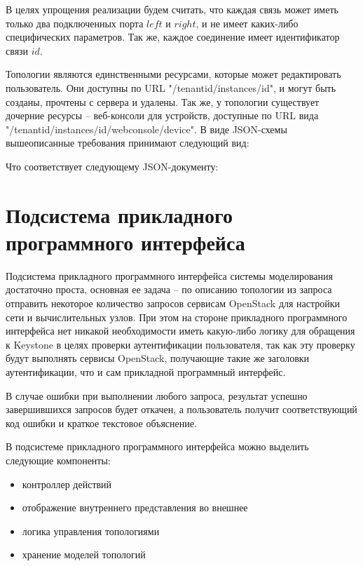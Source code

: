 В целях упрощения реализации будем считать, что каждая связь может иметь только два 
подключенных порта  $left$ и $right$, и не имеет каких-либо специфических параметров.
Так же, каждое соединение имеет идентификатор связи $id$.

Топологии являются единственными ресурсами, которые может редактировать пользователь.
Они доступны по URL "/{tenantid}/instances/{id}", и могут быть созданы, прочтены с сервера и удалены.
Так же, у топологии существует дочерние ресурсы -- веб-консоли для устройств,
доступные по URL вида "/{tenantid}/instances/{id}/webconsole/{device}".
В виде JSON-схемы вышеописанные требования принимают следующий вид:



Что соответствует следующему JSON-документу:




\section{Подсистема прикладного программного интерфейса}

Подсистема прикладного программного интерфейса системы моделирования достаточно проста,
основная ее задача -- по описанию топологии из запроса отправить некоторое количество
запросов сервисам OpenStack для настройки сети и вычислительных узлов.
При этом на стороне прикладного программного интерфейса нет никакой необходимости 
иметь какую-либо логику для обращения к Keystone в целях проверки аутентификации пользователя,
так как эту проверку будут выполнять сервисы OpenStack, получающие такие же заголовки
аутентификации, что и сам прикладной программный интерфейс.

В случае ошибки при выполнении любого запроса, результат успешно завершившихся запросов
будет откачен, а пользователь получит соответствующий код ошибки и краткое текстовое объяснение.

В подсистеме прикладного программного интерфейса можно выделить следующие компоненты:
\begin{itemize}
    \item контроллер действий
    \item отображение внутреннего представления во внешнее
    \item логика управления топологиями
    \item хранение моделей топологий
\end{itemize}

